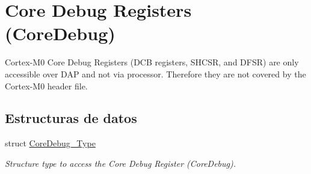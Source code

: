 \hypertarget{group___c_m_s_i_s___core_debug}{}\section{Core Debug Registers (Core\+Debug)}
\label{group___c_m_s_i_s___core_debug}


Cortex-\/\+M0 Core Debug Registers (D\+CB registers, S\+H\+C\+SR, and D\+F\+SR) are only accessible over D\+AP and not via processor. Therefore they are not covered by the Cortex-\/\+M0 header file.  


\subsection*{Estructuras de datos}
\begin{DoxyCompactItemize}
\item 
struct \hyperlink{struct_core_debug___type}{Core\+Debug\+\_\+\+Type}
\begin{DoxyCompactList}\small\item\em Structure type to access the Core Debug Register (Core\+Debug). \end{DoxyCompactList}\end{DoxyCompactItemize}
